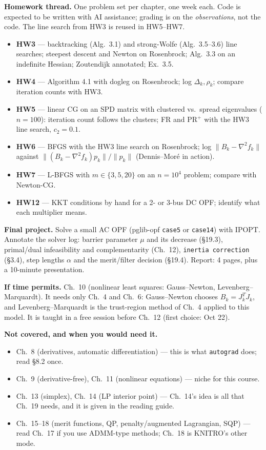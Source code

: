 \documentclass[10pt,a4paper]{article}
\begin{document}
\textbf{Homework thread.} One problem set per chapter, one week each. Code is expected to be written with AI
assistance; grading is on the \emph{observations}, not the code. The line search from HW3 is reused in HW5--HW7.
\begin{itemize}[leftmargin=*,itemsep=0.1em]
  \item \textbf{HW3} --- backtracking (Alg.~3.1) and strong-Wolfe (Alg.~3.5--3.6) line searches; steepest descent
    and Newton on Rosenbrock; Alg.~3.3 on an indefinite Hessian; Zoutendijk annotated; Ex.~3.5.
  \item \textbf{HW4} --- Algorithm 4.1 with dogleg on Rosenbrock; log $\Delta_k,\rho_k$; compare iteration counts
    with HW3.
  \item \textbf{HW5} --- linear CG on an SPD matrix with clustered vs.\ spread eigenvalues ($n=100$): iteration
    count follows the clusters; FR and PR$^{+}$ with the HW3 line search, $c_2=0.1$.
  \item \textbf{HW6} --- BFGS with the HW3 line search on Rosenbrock; log $\|B_k-\nabla^2 f_k\|$ against
    $\|(B_k-\nabla^2 f_k)p_k\|/\|p_k\|$ (Dennis--Mor\'e in action).
  \item \textbf{HW7} --- L-BFGS with $m\in\{3,5,20\}$ on an $n=10^4$ problem; compare with Newton-CG.
  \item \textbf{HW12} --- KKT conditions by hand for a 2- or 3-bus DC OPF; identify what each multiplier means.
\end{itemize}

\textbf{Final project.} Solve a small AC OPF (pglib-opf \texttt{case5} or \texttt{case14}) with IPOPT. Annotate
the solver log: barrier parameter $\mu$ and its decrease (\S19.3), primal/dual infeasibility and complementarity
(Ch.~12), \texttt{inertia correction} (\S3.4), step lengths $\alpha$ and the merit/filter decision (\S19.4).
Report: 4 pages, plus a 10-minute presentation.

\textbf{If time permits.} Ch.~10 (nonlinear least squares: Gauss--Newton, Levenberg--Marquardt). It needs
only Ch.~4 and Ch.~6: Gauss--Newton chooses $B_k=J_k^{T}J_k$, and Levenberg--Marquardt is the trust-region
method of Ch.~4 applied to this model. It is taught in a free session before Ch.~12 (first choice: Oct 22).

\textbf{Not covered, and when you would need it.}
\begin{itemize}[leftmargin=*,itemsep=0.1em]
  \item Ch.~8 (derivatives, automatic differentiation) --- this is what \texttt{autograd} does; read \S8.2 once.
  \item Ch.~9 (derivative-free), Ch.~11 (nonlinear equations) --- niche for this course.
  \item Ch.~13 (simplex), Ch.~14 (LP interior point) --- Ch.~14's idea is all that Ch.~19 needs, and it is given
    in the reading guide.
  \item Ch.~15--18 (merit functions, QP, penalty/augmented Lagrangian, SQP) --- read Ch.~17 if you use
    ADMM-type methods; Ch.~18 is KNITRO's other mode.
\end{itemize}
\end{document}
